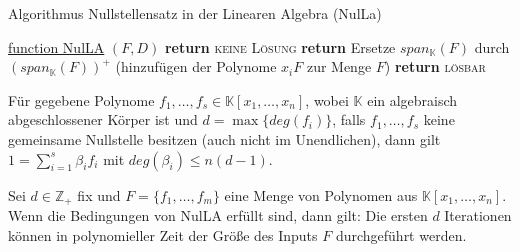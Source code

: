 \begin{mslide}{Algorithmus Nullstellensatz in der Linearen Algebra (NulLa)}
\begin{center}
{\begin{algorithm} [H]
    \underline{function NulLA} $(F,D)$\;
		 {
      {
        \textbf{return} \textsc{keine Lösung}\;
      }
      {
        \textbf{return} Ersetze $span_\mathbb{K}(F)$ durch $(span_\mathbb{K}(F))^+$ (hinzufügen der Polynome $x_iF$ zur Menge $F$)\;
      }
		}
		\textbf{return} \textsc{lösbar}
    \caption{NulLA Algorithmus}
\end{algorithm}
}
\end{center}

\framebreak

\begin{kor}
Für gegebene Polynome $f_1,\ldots,f_s \in \mathbb{K}[x_1,\ldots,x_n]$, wobei $\mathbb{K}$ ein algebraisch abgeschlossener Körper ist und $d = \max\{deg(f_i)\}$, falls $f_1,\ldots,f_s$ keine gemeinsame Nullstelle besitzen (auch nicht im Unendlichen), dann gilt $1 = \sum_{i=1}^s\beta_if_i$ mit $deg(\beta_i) \le n (d-1)$.
\end{kor}


\begin{lem}\label{polTime}
Sei $d \in \mathbb{Z}_+$ fix und $F = \{f_1,\ldots,f_m\}$ eine Menge von Polynomen aus $\mathbb{K}[x_1,\ldots,x_n]$. Wenn die Bedingungen von NulLA erfüllt sind, dann gilt: Die ersten $d$ Iterationen können in polynomieller Zeit der Größe des Inputs $F$ durchgeführt werden.
\end{lem}
\end{mslide}



